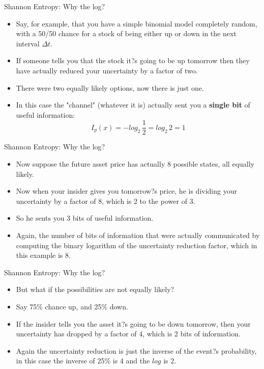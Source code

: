 \documentclass[11pt]{beamer}
\begin{document}
%
%
\begin{frame}{Shannon Entropy: Why the log?}
	\begin{itemize}
		\item Say, for example, that you have a simple binomial model completely random, with a 50/50 chance for a stock of being either up or down in the next interval $\Delta t$. 
		\item If someone tells you that the stock it?s going to be up tomorrow then they have actually reduced your uncertainty by a factor of two. \item There were two equally likely options, now there is just one.
		\item  In this case the "channel" (whatever it is) actually sent you a \textbf{single bit} of useful information:
		\begin{equation}
I_p(x) = - log_2 \, \frac{1}{2} = log_2 \, 2 = 1
\end{equation}

	\end{itemize}
\end{frame}
%
%
\begin{frame}{Shannon Entropy: Why the log?}
	\begin{itemize}
		\item Now suppose the future asset price has actually 8 possible states, all equally likely. 
		\item Now when your insider gives you tomorrow?s price, he is dividing your uncertainty by a factor of 8, which is 2 to the power of 3. 
		\item So he sents you 3 bits of useful information. 
		\item Again, the number of bits of information that were actually communicated by computing the binary logarithm of the uncertainty reduction factor, which in this example is 8. 

	\end{itemize}
\end{frame}
%
%
\begin{frame}{Shannon Entropy: Why the log?}
	\begin{itemize}
		\item But what if the possibilities are not equally likely? 
		\item Say 75\% chance up, and 25\% down. 
		\item If the insider tells you the asset it?s going to be down tomorrow, then your uncertainty has dropped by a factor of 4, which is 2 bits of information. 
\item Again the uncertainty reduction is just the inverse of the event?s probability, in this case the inverse of 25\% is 4 and the $log$ is 2. 
	\end{itemize}
\end{frame}
\end{document}
